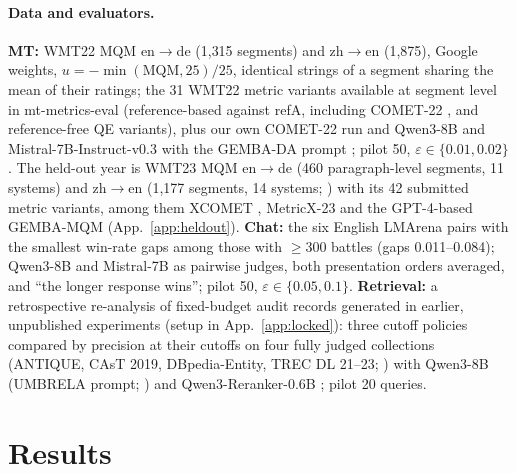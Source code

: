\documentclass[11pt]{article}
\newcommand{\eps}{\varepsilon}
\begin{document}
\paragraph{Data and evaluators.} \textbf{MT:} WMT22 MQM \citep{freitag2021mqm,freitag2022wmt22metrics} en$\to$de
(1{,}315 segments) and zh$\to$en (1{,}875), Google weights, $u=-\min(\mathrm{MQM},25)/25$, identical strings of a
segment sharing the mean of their ratings; the 31 WMT22 metric variants available at segment level in mt-metrics-eval
(reference-based against refA, including COMET-22 \citep{rei2022comet}, and reference-free QE variants), plus our own
COMET-22 run and Qwen3-8B \citep{yang2025qwen3} and Mistral-7B-Instruct-v0.3 \citep{jiang2023mistral} with the GEMBA-DA
prompt \citep{kocmi2023gemba}; pilot 50, $\eps\in\{0.01,0.02\}$. The held-out year is WMT23 MQM en$\to$de (460
paragraph-level segments, 11 systems) and zh$\to$en (1{,}177 segments, 14 systems; \citealp{freitag2023wmt23}) with
its 42 submitted metric variants, among them XCOMET \citep{guerreiro2024xcomet}, MetricX-23 \citep{juraska2023metricx23}
and the GPT-4-based GEMBA-MQM \citep{kocmi2023gembamqm} (App.~\ref{app:heldout}). \textbf{Chat:} the six English LMArena pairs \citep{chiang2024arena} with the smallest
win-rate gaps among those with $\ge300$ battles (gaps 0.011--0.084); Qwen3-8B and Mistral-7B as pairwise judges, both
presentation orders averaged, and ``the longer response wins''; pilot 50, $\eps\in\{0.05,0.1\}$. \textbf{Retrieval:} a retrospective re-analysis of fixed-budget
audit records generated in earlier, unpublished experiments (setup in App.~\ref{app:locked}): three cutoff policies compared
by precision at their cutoffs on four fully judged collections (ANTIQUE, CAsT 2019, DBpedia-Entity, TREC DL 21--23;
\citealp{hashemi2020antique,dalton2020cast,hasibi2017dbpedia,craswell2021dl21,craswell2022dl22,craswell2023dl23}) with
Qwen3-8B (UMBRELA prompt; \citealp{upadhyay2024umbrela}) and Qwen3-Reranker-0.6B \citep{zhang2025qwen3embedding};
pilot 20 queries.

\section{Results}\label{sec:results}
\end{document}
